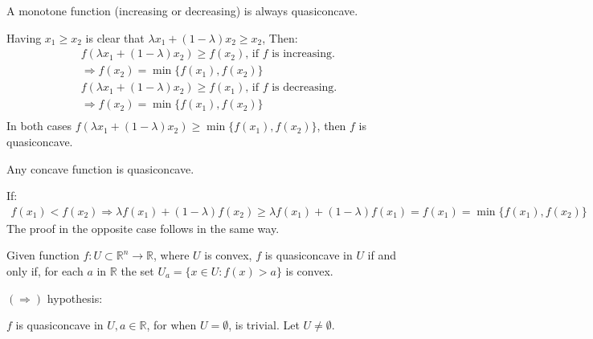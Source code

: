 \documentclass[answers]{exam}
\theoremstyle{definition}
\begin{document}
\begin{questions}
    \question A monotone function (increasing or decreasing) is always quasiconcave.

        \begin{solution}
        Having $x_1\geq x_2$ is clear that $\lambda x_1+(1-\lambda) x_2\geq x_2$, Then:
        \begin{align*}
            f(\lambda x_1+(1-\lambda) x_2)\geq f(x_2)\text{, if $f$ is increasing.}\\
            \Rightarrow f(x_2)=\min\{f(x_1),f(x_2)\}\\
            f(\lambda x_1+(1-\lambda) x_2)\geq f(x_1)\text{, if $f$ is decreasing.}\\
            \Rightarrow f(x_2)=\min\{f(x_1),f(x_2)\}\\
        \end{align*}
        In both cases $f(\lambda x_1+(1-\lambda)x_2)\geq\min\{f(x_1),f(x_2)\}$, then $f$ is quasiconcave.
        
        \end{solution}

    \question Any concave function is quasiconcave.
    \begin{solution}
        If:
        \begin{align*}
            f(x_1)<f(x_2)\Rightarrow \lambda f(x_1)+(1-\lambda)f(x_2)\geq\lambda f(x_1)+(1-\lambda)f(x_1)=f(x_1)=\min\{f(x_1),f(x_2)\}
        \end{align*}
        The proof in the opposite case follows in the same way.
    \end{solution}
    
    \question\label{q:uesful} Given function $f:U\subset\mathds{R}^n\rightarrow \mathds{R}$, where $U$ is convex, $f$ is quasiconcave in $U$ if and only if, for each $a$ in $\mathds{R}$ the set $U_a=\{x\in U:f(x)>a\}$ is convex.
    
        \begin{solution}

        $(\Rightarrow)$ hypothesis: 
        
        $f$ is quasiconcave in $U, a\in\mathds{R}$, for when $U=\emptyset$, is trivial. Let $U\neq\emptyset$.
        

\end{solution}
\end{questions}
\end{document}
